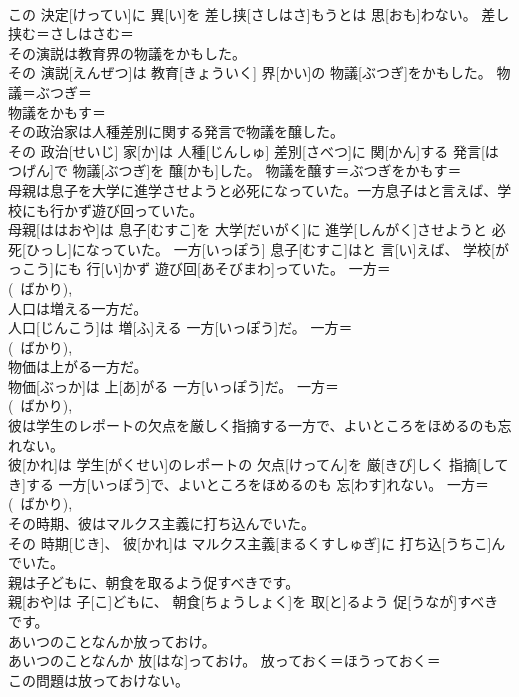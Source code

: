 \documentclass[8pt]{extreport}
\begin{document}
\begin{CJK}{UTF8}{min}
\\	この 決定[けってい]に 異[い]を 差し挟[さしはさ]もうとは 思[おも]わない。	差し挟む＝さしはさむ＝ 
\\	その演説は教育界の物議をかもした。	
\\	その 演説[えんぜつ]は 教育[きょういく] 界[かい]の 物議[ぶつぎ]をかもした。	物議＝ぶつぎ＝ 
\\	物議をかもす＝ 
\\	その政治家は人種差別に関する発言で物議を醸した。	
\\	その 政治[せいじ] 家[か]は 人種[じんしゅ] 差別[さべつ]に 関[かん]する 発言[はつげん]で 物議[ぶつぎ]を 醸[かも]した。	物議を醸す＝ぶつぎをかもす＝ 
\\	母親は息子を大学に進学させようと必死になっていた。一方息子はと言えば、学校にも行かず遊び回っていた。	
\\	母親[ははおや]は 息子[むすこ]を 大学[だいがく]に 進学[しんがく]させようと 必死[ひっし]になっていた。 一方[いっぽう] 息子[むすこ]はと 言[い]えば、 学校[がっこう]にも 行[い]かず 遊び回[あそびまわ]っていた。	一方＝ 
\\	(~ばかり), 
\\	人口は増える一方だ。	
\\	人口[じんこう]は 増[ふ]える 一方[いっぽう]だ。	一方＝ 
\\	(~ばかり), 
\\	物価は上がる一方だ。	
\\	物価[ぶっか]は 上[あ]がる 一方[いっぽう]だ。	一方＝ 
\\	(~ばかり), 
\\	彼は学生のレポートの欠点を厳しく指摘する一方で、よいところをほめるのも忘れない。	
\\	彼[かれ]は 学生[がくせい]のレポートの 欠点[けってん]を 厳[きび]しく 指摘[してき]する 一方[いっぽう]で、よいところをほめるのも 忘[わす]れない。	一方＝ 
\\	(~ばかり), 
\\	その時期、彼はマルクス主義に打ち込んでいた。	
\\	その 時期[じき]、 彼[かれ]は マルクス主義[まるくすしゅぎ]に 打ち込[うちこ]んでいた。	
\\	親は子どもに、朝食を取るよう促すべきです。	
\\	親[おや]は 子[こ]どもに、 朝食[ちょうしょく]を 取[と]るよう 促[うなが]すべきです。	
\\	あいつのことなんか放っておけ。	
\\	あいつのことなんか 放[はな]っておけ。	放っておく＝ほうっておく＝ 
\\	この問題は放っておけない。	

\end{CJK}
\end{document}
